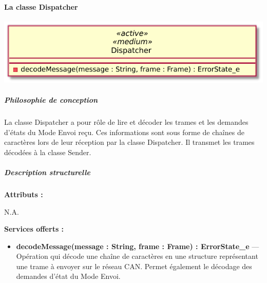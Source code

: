 \paragraph{La classe Dispatcher}

\begin{minipage}
    {\linewidth}
    \centering
    \includegraphics[width=0.55\linewidth]{../schemas/Conception_detaillee/classe_dispatcher.pdf}
\end{minipage}

\subparagraph{Philosophie de conception \newline} 

\medspace

La classe Dispatcher a pour rôle de lire et décoder les trames et les demandes d'états du Mode Envoi reçu. Ces informations sont sous forme de chaînes de caractères lors de leur réception par la classe Dispatcher. Il transmet les trames décodées à la classe Sender.

\subparagraph{Description structurelle \newline}

\medspace

\textbf{Attributs :}

N.A.

\textbf{Services offerts :}

\begin{itemize}
    \item \textbf{decodeMessage(message : String, frame : Frame) : ErrorState\_e} --- Opération qui décode une chaîne de caractères en une structure représentant une trame à envoyer sur le réseau CAN. Permet également le décodage des demandes d'état du Mode Envoi.
\end{itemize}
